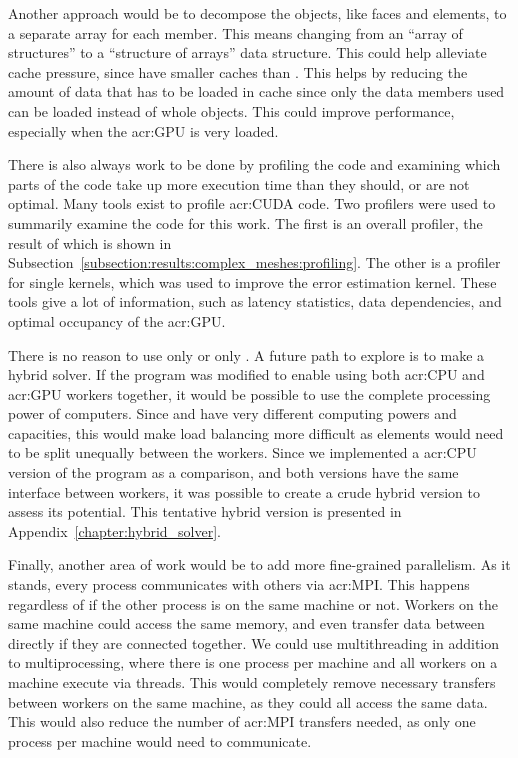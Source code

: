 Another approach would be to decompose the objects, like faces and elements, to a separate array for
each member. This means changing from an ``array of structures'' to a ``structure of arrays'' data
structure. This could help alleviate cache pressure, since  have smaller caches
than . This helps by reducing the amount of data that has to be loaded in cache
since only the data members used can be loaded instead of whole objects. This could improve
performance, especially when the \acrshort{acr:GPU} is very loaded.

There is also always work to be done by profiling the code and examining which parts of the code
take up more execution time than they should, or are not optimal. Many tools exist to profile
\acrshort{acr:CUDA} code. Two profilers were used to summarily examine the code for this work. The
first is an overall profiler, the result of which is shown in
Subsection~\ref{subsection:results:complex_meshes:profiling}. The other is a profiler for single
kernels, which was used to improve the error estimation kernel. These tools give a lot of
information, such as latency statistics, data dependencies, and optimal occupancy of the
\acrshort{acr:GPU}.

There is no reason to use only  or only . A future path to
explore is to make a hybrid solver. If the program was modified to enable using both
\acrshort{acr:CPU} and \acrshort{acr:GPU} workers together, it would be possible to use the complete
processing power of computers. Since  and  have very
different computing powers and capacities, this would make load balancing more difficult as elements
would need to be split unequally between the workers. Since we implemented a \acrshort{acr:CPU}
version of the program as a comparison, and both versions have the same interface between workers,
it was possible to create a crude hybrid version to assess its potential. This tentative hybrid
version is presented in Appendix~\ref{chapter:hybrid_solver}.

Finally, another area of work would be to add more fine-grained parallelism. As it stands, every
process communicates with others via \acrshort{acr:MPI}. This happens regardless of if
the other process is on the same machine or not. Workers on the same machine could access the same
memory, and even transfer data between  directly if they are connected together.
We could use multithreading in addition to multiprocessing, where there is one process per machine
and all workers on a machine execute via threads. This would completely remove necessary transfers
between workers on the same machine, as they could all access the same data. This would also reduce
the number of \acrshort{acr:MPI} transfers needed, as only one process per machine would need to
communicate.

